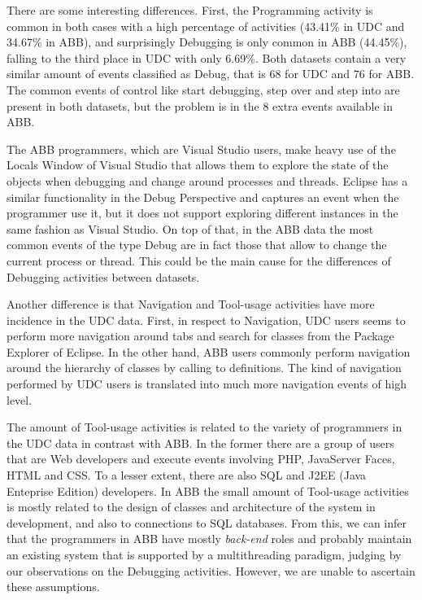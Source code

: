 There are some interesting differences. First, the Programming activity is common in both cases with a high percentage of activities (43.41\% in UDC and 34.67\% in ABB), and surprisingly Debugging is only common in ABB (44.45\%), falling to the third place in UDC with only 6.69\%. Both datasets contain a very similar amount of events classified as Debug, that is 68 for UDC and 76 for ABB. The common events of control like start debugging, step over and step into are present in both datasets, but the problem is in the 8 extra events available in ABB. 

The ABB programmers, which are Visual Studio users, make heavy use of the Locals Window of Visual Studio that allows them to explore the state of the objects when debugging and change around processes and threads. Eclipse has a similar functionality in the Debug Perspective and captures an event when the programmer use it, but it does not support exploring different instances in the same fashion as Visual Studio. On top of that, in the ABB data the most common events of the type Debug are in fact those that allow to change the current process or thread. This could be the main cause for the differences of Debugging activities between datasets.

Another difference is that Navigation and Tool-usage activities have more incidence in the UDC data. First, in respect to Navigation, UDC users seems to perform more navigation around tabs and search for classes from the Package Explorer of Eclipse. In the other hand, ABB users commonly perform navigation around the hierarchy of classes by calling to definitions. The kind of navigation performed by UDC users is translated into much more navigation events of high level.

The amount of Tool-usage activities is related to the variety of programmers in the UDC data in contrast with ABB. In the former there are a group of users that are Web developers and execute events involving PHP, JavaServer Faces, HTML and CSS. To a lesser extent, there are also SQL and J2EE (Java Enteprise Edition) developers. In ABB the small amount of Tool-usage activities is mostly related to the design of classes and architecture of the system in development, and also to connections to SQL databases. From this, we can infer that the programmers in ABB have mostly \emph{back-end} roles and probably maintain an existing system that is supported by a multithreading paradigm, judging by our observations on the Debugging activities. However, we are unable to ascertain these assumptions.


